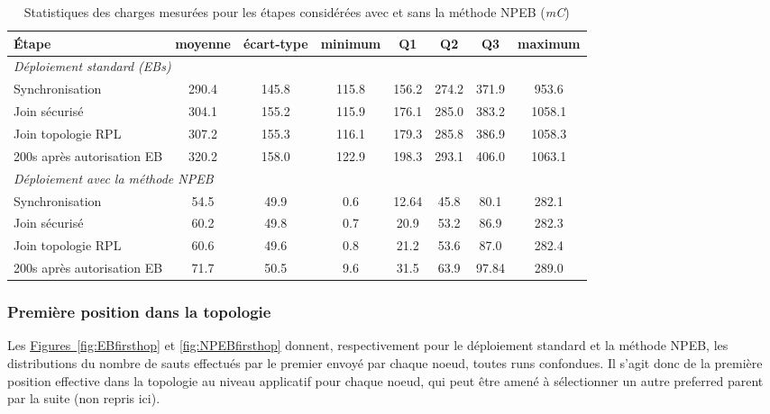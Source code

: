\documentclass[]{report}
\newcommand{\wordlink}[2]{\hyperref[#2]{#1~\ref{#2}}}
\begin{document}
\begin{table}[h]
\centering
\begin{tabular}{|l|c|c|c|c|c|c|c|}
	\hline
    \textbf{\textbf{Étape}} & moyenne & écart-type & minimum & Q1 & Q2 & Q3 & maximum\\
    \hline
    \multicolumn{8}{|l|}{\textit{Déploiement standard (EBs)}}\\  
    \hline
    Synchronisation & 290.4 & 145.8 & 115.8 & 156.2 & 274.2 & 371.9 & 953.6\\
    \hline
    Join sécurisé & 304.1 & 155.2 & 115.9 & 176.1 & 285.0 & 383.2 & 1058.1 \\
    \hline
    Join topologie RPL & 307.2 & 155.3 & 116.1 & 179.3 & 285.8 & 386.9 & 1058.3 \\
    \hline
    200s après autorisation EB & 320.2 & 158.0 & 122.9 & 198.3 & 293.1 & 406.0 & 1063.1 \\
    \hline
    \multicolumn{8}{|l|}{\textit{Déploiement avec la méthode NPEB}}\\    
    \hline
    Synchronisation & 54.5 & 49.9 & 0.6 & 12.64 & 45.8 & 80.1 & 282.1 \\
    \hline
    Join sécurisé & 60.2 & 49.8 & 0.7 & 20.9 & 53.2 & 86.9 & 282.3 \\
    \hline
    Join topologie RPL & 60.6 & 49.6 & 0.8 & 21.2 & 53.6 & 87.0 & 282.4 \\
    \hline
    200s après autorisation EB & 71.7 & 50.5 & 9.6 & 31.5 & 63.9 & 97.84 & 289.0 \\
    \hline
\end{tabular}
\caption{Statistiques des charges mesurées pour les étapes considérées avec et sans la méthode NPEB (\textit{mC})}
\label{table_charges}
\end{table}

\subsubsection{Première position dans la topologie}
\label{results_hops}

Les \wordlink{Figures}{fig:EBfirsthop} et \ref{fig:NPEBfirsthop} donnent, respectivement pour le déploiement standard et la méthode NPEB, les distributions du nombre de sauts effectués par le premier envoyé par chaque noeud, toutes runs confondues. Il s'agit donc de la première position effective dans la topologie au niveau applicatif pour chaque noeud, qui peut être amené à sélectionner un autre preferred parent par la suite (non repris ici).
\end{document}
